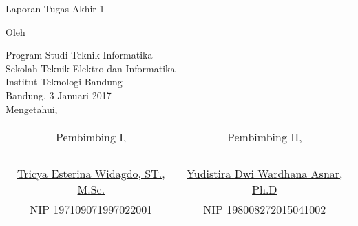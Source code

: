 \clearpage
\pagestyle{empty}

\begin{center}
\smallskip

    \Large \bfseries \MakeUppercase{\thetitle}
    \vfill

    \Large Laporan Tugas Akhir 1
    \vfill

    \large Oleh

    \Large \theauthor

    \large Program Studi Teknik Informatika \\
    \normalsize \normalfont
    Sekolah Teknik Elektro dan Informatika \\
    Institut Teknologi Bandung \\

    \vfill
    \normalsize \normalfont
    Bandung, 3 Januari 2017 \\
    Mengetahui,

    \vfill
    \setlength{\tabcolsep}{12pt}
    \begin{tabular}{c@{\hskip 0.5in}c}
        Pembimbing I, & Pembimbing II, \\
        & \\
        & \\
        & \\
        & \\
        \underline{Tricya Esterina Widagdo, ST., M.Sc.} & \underline{Yudistira Dwi Wardhana Asnar, Ph.D} \\
        NIP 197109071997022001 & NIP 198008272015041002 \\
    \end{tabular}

\end{center}
\clearpage
